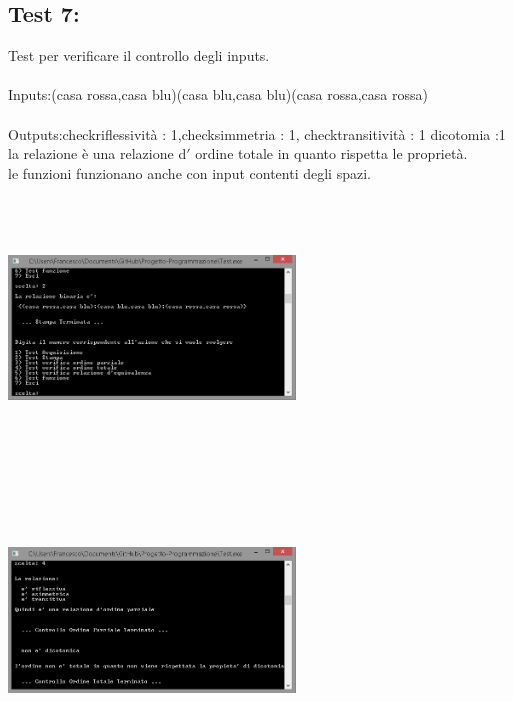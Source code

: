 \documentclass[11pt, a4paper, titlepage, block]{article}
\begin{document}
	\subsection{Test 7:}
	Test per verificare il controllo degli inputs.\\
	\\
	Inputs:(casa rossa,casa blu)(casa blu,casa blu)(casa rossa,casa rossa)\\
	\\
	Outputs:check\textunderscore riflessivit\`a : 1,check\textunderscore simmetria : 1, check\textunderscore transitivit\`a : 1 dicotomia :1
	la relazione \`e una relazione d$'$ ordine totale in quanto rispetta le propriet\`a.\\
	le funzioni funzionano anche con input contenti degli spazi.\\
	\includegraphics[width=3in,height=3in,viewport=0 0 300 300]{../Screenshots/Test7Input.png}
	\\
	\includegraphics[width=3in,height=3in,viewport=0 0 300 300]{../Screenshots/Test7Output.png}
	\\
	\\
	\newpage
\end{document}
